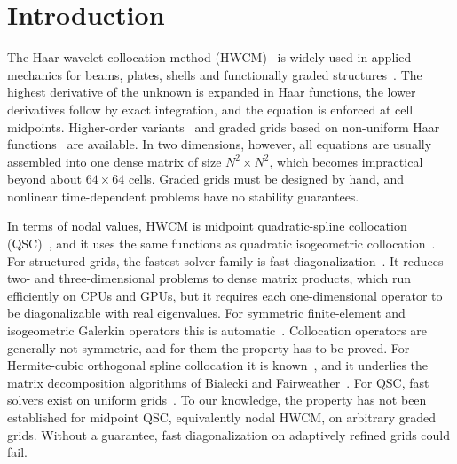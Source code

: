 \documentclass[preprint,12pt]{elsarticle}
\theoremstyle{remark}
\begin{document}
\section{Introduction}
The Haar wavelet collocation method (HWCM)~\cite{chen1997haar,lepik2005numerical,lepik2011solving,lepik2014book}
is widely used in applied mechanics for beams, plates, shells and functionally graded
structures~\cite{majak2015accuracy,majak2015convergence,majak2018higher}. The highest derivative of the
unknown is expanded in Haar functions, the lower derivatives follow by exact integration, and the
equation is enforced at cell midpoints. Higher-order variants~\cite{majak2018higher,ratas2021solving} and
graded grids based on non-uniform Haar functions~\cite{dubeau2004nonuniform,lepik2008nonuniform,oruc2019nonuniform}
are available. In two dimensions, however, all equations are usually assembled into one dense matrix of
size $N^2\times N^2$, which becomes impractical beyond about $64\times64$ cells. Graded grids must be
designed by hand, and nonlinear time-dependent problems have no stability guarantees.

In terms of nodal values, HWCM is midpoint quadratic-spline collocation
(QSC)~\cite{houstis1988quadratic,christara1994quadratic,christara2006optimal}, and it uses the same
functions as quadratic isogeometric collocation~\cite{auricchio2010isogeometric,schillinger2013isogeometric}.
For structured grids, the fastest solver family is fast diagonalization~\cite{lynch1964direct}. It
reduces two- and three-dimensional problems to dense matrix products, which run efficiently on CPUs and
GPUs, but it requires each one-dimensional operator to be diagonalizable with real eigenvalues. For
symmetric finite-element and isogeometric Galerkin operators this is automatic~\cite{sangalli2016isogeometric}.
Collocation operators are generally not symmetric, and for them the property has to be proved. For
Hermite-cubic orthogonal spline collocation it is known~\cite{dyksen1987tensor,sun1999spectral}, and it
underlies the matrix decomposition algorithms of Bialecki and Fairweather~\cite{bialecki1995matrix,bialecki2011matrix}.
For QSC, fast solvers exist on uniform grids~\cite{christara2002fast}. To our knowledge, the property has
not been established for midpoint QSC, equivalently nodal HWCM, on arbitrary graded grids.
Without a guarantee, fast diagonalization on adaptively refined grids could fail.
\end{document}
